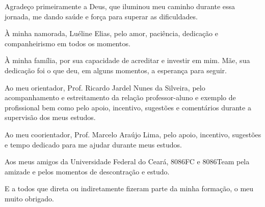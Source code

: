 \begin{agradecimentos}
	Agradeço primeiramente a Deus, que iluminou meu caminho durante essa jornada, me dando saúde e força para superar as dificuldades.
	
	À minha namorada, Luéline Elias, pelo amor, paciência, dedicação e companheirismo em todos os momentos.
	
	À minha família, por sua capacidade de acreditar e investir em mim. Mãe, sua dedicação foi o que deu, em alguns momentos, a esperança para seguir. 
	
	Ao meu orientador, Prof. Ricardo Jardel Nunes da Silveira, pelo acompanhamento e estreitamento da relação professor-aluno e exemplo de profissional bem como pelo apoio, incentivo, sugestões e comentários durante a supervisão dos meus estudos.
	
	Ao meu coorientador, Prof. Marcelo Araújo Lima, pelo apoio, incentivo, sugestões e tempo dedicado para me ajudar durante meus estudos.
	
	Aos meus amigos da Universidade Federal do Ceará, 8086FC e 8086Team pela amizade e pelos momentos de descontração e estudo.
	
	E a todos que direta ou indiretamente fizeram parte da minha formação, o meu muito obrigado.
\end{agradecimentos}
